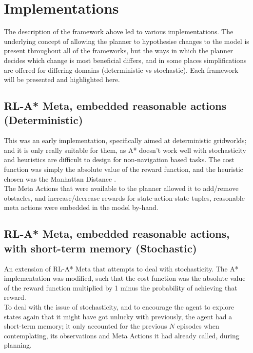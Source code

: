 \section{Implementations}
The description of the framework above led to various implementations. The underlying concept of allowing the planner to hypothesise changes to the model is present throughout all of the frameworks, but the ways in which the planner decides which change is most beneficial differs, and in some places simplifications are offered for differing domains (deterministic vs stochastic). Each framework will be presented and highlighted here.
\subsection{RL-A* Meta, embedded reasonable actions (Deterministic)}
This was an early implementation, specifically aimed at deterministic gridworlds; and it is only really suitable for them, as A* doesn't work well with stochasticity and heuristics are difficult to design for non-navigation based tasks. The cost function was simply the absolute value of the reward function, and the heuristic chosen was the Manhattan Distance \cite{krause1973taxicab}.
\\The Meta Actions that were available to the planner allowed it to add/remove obstacles, and increase/decrease rewards for state-action-state tuples, reasonable meta actions were embedded in the model by-hand.
\subsection{RL-A* Meta, embedded reasonable actions, with short-term memory (Stochastic)}
An extension of RL-A* Meta that attempts to deal with stochasticity. The A* implementation was modified, such that the cost function was the absolute value of the reward function multiplied by 1 minus the probability of achieving that reward.
\\To deal with the issue of stochasticity, and to encourage the agent to explore states again that it might have got unlucky with previously, the agent had a short-term memory; it only accounted for the previous $N$ episodes when contemplating, its observations and Meta Actions it had already called, during planning.
